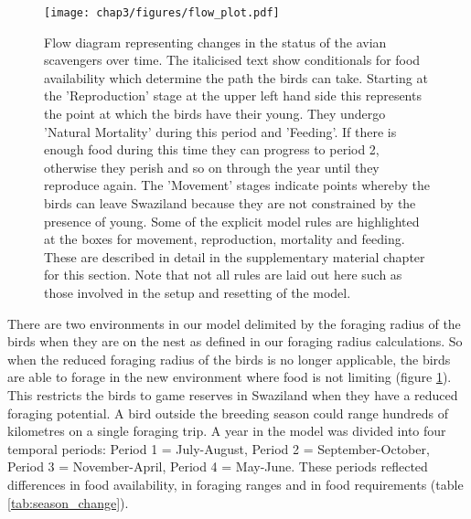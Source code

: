 \begin{figure}[H] %
	  \centering
	  \texttt{[image: chap3/figures/flow\_plot.pdf]}
	    \caption[Flow diagram for PDP system model] %
	    {Flow diagram representing changes in the status of the avian scavengers over time. The italicised text show conditionals for food availability which determine the path the birds can take. Starting at the 'Reproduction' stage at the upper left hand side this represents the point at which the birds have their young. They undergo 'Natural Mortality' during this period and 'Feeding'. If there is enough food during this time they can progress to period 2, otherwise they perish and so on through the year until they reproduce again. The 'Movement' stages indicate points whereby the birds can leave Swaziland because they are not constrained by the presence of young. Some of the explicit model rules are highlighted at the boxes for movement, reproduction, mortality and feeding. These are described in detail in the supplementary material chapter for this section. Note that not all rules are laid out here such as those involved in the setup and resetting of the model.}%
	  \label{fig:flow_plot}
	\end{figure}
	
There are two environments in our model delimited by the foraging radius of the birds when they are on the nest as defined in our foraging radius calculations. So when the reduced foraging radius of the birds is no longer applicable, the birds are able to forage in the new environment where food is not limiting (figure \ref{fig:flow_plot}). This restricts the birds to game reserves in Swaziland when they have a reduced foraging potential. A bird outside the breeding season could range hundreds of kilometres on a single foraging trip. A year in the model was divided into four temporal periods: Period 1 = July-August, Period 2 = September-October, Period 3 = November-April, Period 4 = May-June. These periods reflected differences in food availability, in foraging ranges and in food requirements (table \ref{tab:season_change}). 

\begin{table}
\small %
		\caption[Carcass data] %
				{Identity, number of species and average carrion provided per year of the ungulate population of Swaziland.} 
		
		\label{tab:carrion_amount}
	\end{table}


